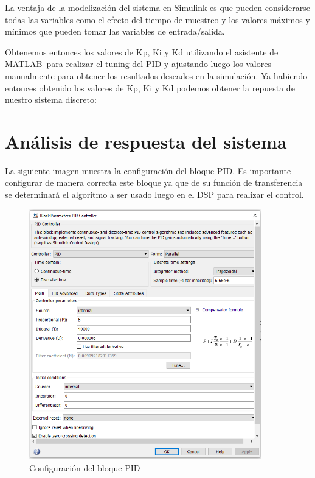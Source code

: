 \documentclass[12pt]{report}
\begin{document}
	La ventaja de la modelización del sistema en Simulink es que pueden considerarse todas las variables como el efecto del tiempo de muestreo y los valores máximos y mínimos que pueden tomar las variables de entrada/salida.

	Obtenemos entonces los valores de Kp, Ki y Kd utilizando el asistente de MATLAB\textregistered \ para realizar el tuning del PID y ajustando luego los valores manualmente para obtener los resultados deseados en la simulación. Ya habiendo entonces obtenido los valores de Kp, Ki y Kd podemos obtener la repuesta de nuestro sistema discreto:

	\newpage
	\section{Análisis de respuesta del sistema}
	
	La siguiente imagen muestra la configuración del bloque PID. Es importante configurar de manera correcta este bloque ya que de su función de transferencia se determinará el algoritmo a ser usado luego en el DSP para realizar el control.
	
	\begin{figure}[H]
		\centering
		\includegraphics[width=0.9\textwidth,height=\textheight,keepaspectratio]{Simulink_PID}
		\caption{Configuración del bloque PID}
	\end{figure}
\end{document}
